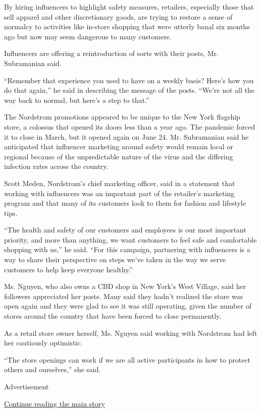 By hiring influencers to highlight safety measures, retailers,
especially those that sell apparel and other discretionary goods, are
trying to restore a sense of normalcy to activities like in-store
shopping that were utterly banal six months ago but now may seem
dangerous to many customers.

Influencers are offering a reintroduction of sorts with their posts, Mr.
Subramanian said.

``Remember that experience you used to have on a weekly basis? Here's
how you do that again,'' he said in describing the message of the posts.
``We're not all the way back to normal, but here's a step to that.''

The Nordstrom promotions appeared to be unique to the New York flagship
store, a colossus that opened its doors less than a year ago. The
pandemic forced it to close in March, but it opened again on June 24.
Mr. Subramanian said he anticipated that influencer marketing around
safety would remain local or regional because of the unpredictable
nature of the virus and the differing infection rates across the
country.

Scott Meden, Nordstrom's chief marketing officer, said in a statement
that working with influencers was an important part of the retailer's
marketing program and that many of its customers look to them for
fashion and lifestyle tips.

``The health and safety of our customers and employees is our most
important priority, and more than anything, we want customers to feel
safe and comfortable shopping with us,'' he said. ``For this campaign,
partnering with influencers is a way to share their perspective on steps
we've taken in the way we serve customers to help keep everyone
healthy.''

Ms. Nguyen, who also owns a CBD shop in New York's West Village, said
her followers appreciated her posts. Many said they hadn't realized the
store was open again and they were glad to see it was still operating,
given the number of stores around the country that have been forced to
close permanently.

As a retail store owner herself, Ms. Nguyen said working with Nordstrom
had left her cautiously optimistic.

``The store openings can work if we are all active participants in how
to protect others and ourselves,'' she said.

Advertisement

\protect\hyperlink{after-bottom}{Continue reading the main story}

